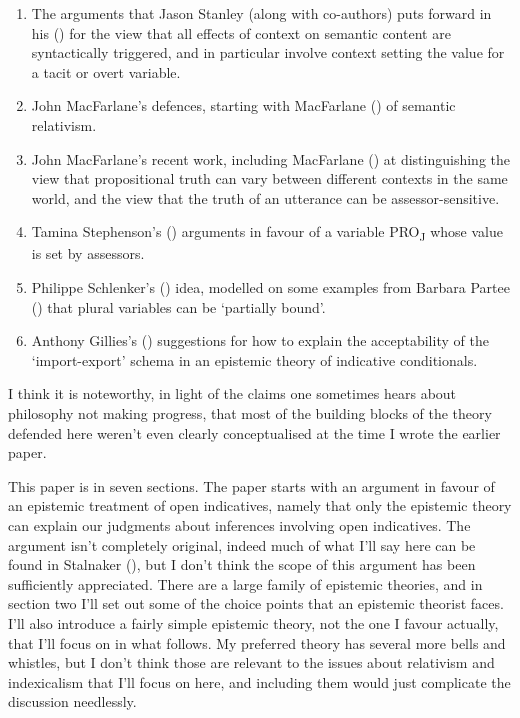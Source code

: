 \documentclass[
  11pt,
  letterpaper,
  DIV=11,
  numbers=noendperiod,
  twoside]{scrartcl}
\providecommand{\tightlist}{%
  \setlength{\itemsep}{0pt}\setlength{\parskip}{0pt}}
\begin{document}
\begin{enumerate}
\def\labelenumi{\arabic{enumi}.}
\tightlist
\item
  The arguments that Jason Stanley (along with co-authors) puts forward
  in his () for the view that all
  effects of context on semantic content are syntactically triggered,
  and in particular involve context setting the value for a tacit or
  overt variable.
\item
  John MacFarlane's defences, starting with MacFarlane
  () of semantic relativism.
\item
  John MacFarlane's recent work, including MacFarlane
  () at distinguishing the view
  that propositional truth can vary between different contexts in the
  same world, and the view that the truth of an utterance can be
  assessor-sensitive.
\item
  Tamina Stephenson's () arguments in
  favour of a variable PRO\textsubscript{J} whose value is set by
  assessors.
\item
  Philippe Schlenker's () idea,
  modelled on some examples from Barbara Partee
  () that plural variables can be
  `partially bound'.
\item
  Anthony Gillies's ()
  suggestions for how to explain the acceptability of the
  `import-export' schema in an epistemic theory of indicative
  conditionals.
\end{enumerate}

I think it is noteworthy, in light of the claims one sometimes hears
about philosophy not making progress, that most of the building blocks
of the theory defended here weren't even clearly conceptualised at the
time I wrote the earlier paper.

This paper is in seven sections. The paper starts with an argument in
favour of an epistemic treatment of open indicatives, namely that only
the epistemic theory can explain our judgments about inferences
involving open indicatives. The argument isn't completely original,
indeed much of what I'll say here can be found in Stalnaker
(), but I don't think the scope
of this argument has been sufficiently appreciated. There are a large
family of epistemic theories, and in section two I'll set out some of
the choice points that an epistemic theorist faces. I'll also introduce
a fairly simple epistemic theory, not the one I favour actually, that
I'll focus on in what follows. My preferred theory has several more
bells and whistles, but I don't think those are relevant to the issues
about relativism and indexicalism that I'll focus on here, and including
them would just complicate the discussion needlessly.
\end{document}

